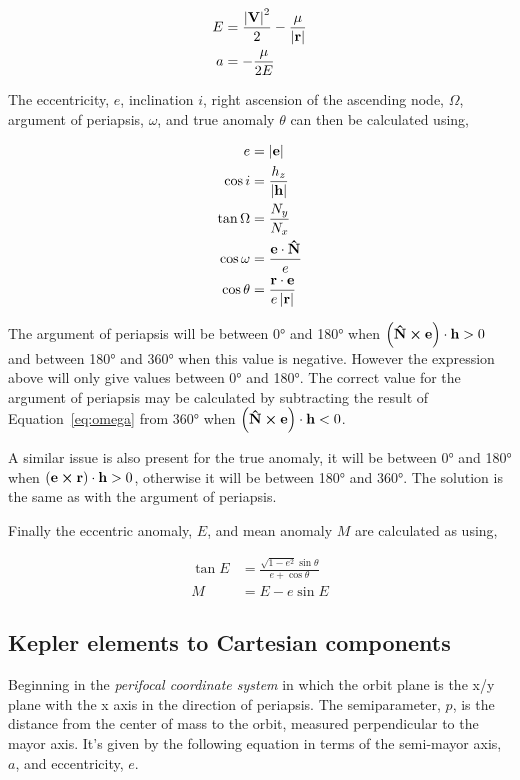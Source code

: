     \begin{align}
        E &= \frac{\left| \mathbf{V} \right|^2}{2} - \frac{\mu}{\left| \mathbf{r} \right|} \\
        a &= - \frac{\mu}{2E}
    \end{align}

    The eccentricity, $e$, inclination $i$, right ascension of the ascending node, $\Omega$, argument of periapsis, $\omega$, and true anomaly $\theta$ can then be calculated using,

    \begin{align}
        e &= \left| \mathbf{e} \right| \\
        \cos{i} &= \frac{h_z}{\left| \mathbf{h} \right|} \\
        \tan{\Omega} &= \frac{N_y}{N_x} \\
        \cos{\omega} &= \frac{\mathbf{e} \cdot \mathbf{\hat{N}}}{e} \label{eq:omega} \\
        \cos{\theta} &= \frac{\mathbf{r} \cdot \mathbf{e}}{e\left| \mathbf{r} \right|}
    \end{align}

    The argument of periapsis will be between 0° and 180° when $\left(\mathbf{\hat{N}} \cross \mathbf{e}\right) \cdot \mathbf{h} > 0$ and between 180° and 360° when this value is negative. However the expression above will only give values between 0° and 180°. The correct value for the argument of periapsis may be calculated by subtracting the result of Equation~\ref{eq:omega} from 360° when $\left(\mathbf{\hat{N}} \cross \mathbf{e}\right) \cdot \mathbf{h} < 0$.

    A similar issue is also present for the true anomaly, it will be between 0° and 180° when $\left(\mathbf{e} \cross \mathbf{r}\right) \cdot \mathbf{h} > 0$, otherwise it will be between 180° and 360°. The solution is the same as with the argument of periapsis.

    Finally the eccentric anomaly, $E$, and mean anomaly $M$ are calculated as using, 

    \begin{align}
        \tan{E} &= \frac{\sqrt{1 - e^2} \sin{\theta}}{e + \cos{\theta}} \\
        M &= E - e \sin{E}
    \end{align}

    \subsection{Kepler elements to Cartesian components}
    Beginning in the \emph{perifocal coordinate system} in which the orbit plane is the x/y plane with the x axis in the direction of periapsis. The semiparameter, $p$, is the distance from the center of mass to the orbit, measured perpendicular to the mayor axis. It's given by the following equation in terms of the semi-mayor axis, $a$, and eccentricity, $e$.

